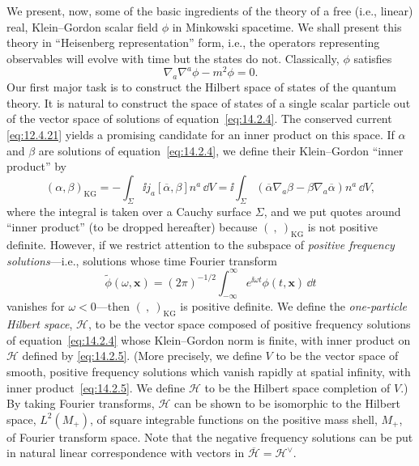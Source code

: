 We present, now, some of the basic ingredients of the theory of a free (i.e., linear)
real, Klein--Gordon scalar field \(\phi\) in Minkowski spacetime. We shall present
this theory in ``Heisenberg representation'' form, i.e., the operators representing
observables will evolve with time but the states do not. Classically, \(\phi\) satisfies
\begin{equation}
  \nabla_a\nabla^a\phi-m^2\phi=0.
  \tag{14.2.4}\label{eq:14.2.4}
\end{equation}
Our first major task is to construct the Hilbert space of states of the quantum theory.
It is natural to construct the space of states of a single scalar particle out of the
vector space of solutions of equation~\eqref{eq:14.2.4}. The conserved current
\eqref{eq:12.4.21} yields a promising candidate for an inner product on this space.
If \(\alpha\) and \(\beta\) are solutions of equation~\eqref{eq:14.2.4}, we define
their Klein--Gordon ``inner product'' by
\begin{equation}
  (\alpha,\beta)_{\mathrm{KG}}
  =-\int_\Sigma \ii j_a[\overline\alpha,\beta]n^a\,\dd V
  =\ii\int_\Sigma
    (\overline\alpha\nabla_a\beta-\beta\nabla_a\overline\alpha)n^a\,\dd V,
  \tag{14.2.5}\label{eq:14.2.5}
\end{equation}
where the integral is taken over a Cauchy surface \(\Sigma\), and we put quotes
around ``inner product'' (to be dropped hereafter) because \((\ ,\ )_{\mathrm{KG}}\)
is not positive definite. However, if we restrict attention to the subspace of
\emph{positive frequency solutions}---i.e., solutions whose time Fourier transform
\begin{equation}
  \widetilde\phi(\omega,\boldsymbol{x})
  =(2\pi)^{-1/2}\int_{-\infty}^{\infty}
    e^{\ii\omega t}\phi(t,\boldsymbol{x})\,\dd t
  \tag{14.2.6}\label{eq:14.2.6}
\end{equation}
vanishes for \(\omega<0\)---then \((\ ,\ )_{\mathrm{KG}}\) is positive definite. We
define the \emph{one-particle Hilbert space}, \(\mathcal H\), to be the vector space
composed of positive frequency solutions of equation~\eqref{eq:14.2.4} whose
Klein--Gordon norm is finite, with inner product on \(\mathcal H\) defined by
\eqref{eq:14.2.5}. (More precisely, we define \(V\) to be the vector space of
smooth, positive frequency solutions which vanish rapidly at spatial infinity, with
inner product~\eqref{eq:14.2.5}. We define \(\mathcal H\) to be the Hilbert space
completion of \(V\).) By taking Fourier transforms, \(\mathcal H\) can be shown to
be isomorphic to the Hilbert space, \(L^2(M_+)\), of square integrable functions on
the positive mass shell, \(M_+\), of Fourier transform space. Note that the negative
frequency solutions can be put in natural linear correspondence with vectors in
\(\overline{\mathcal H}=\mathcal H^\vee\).

